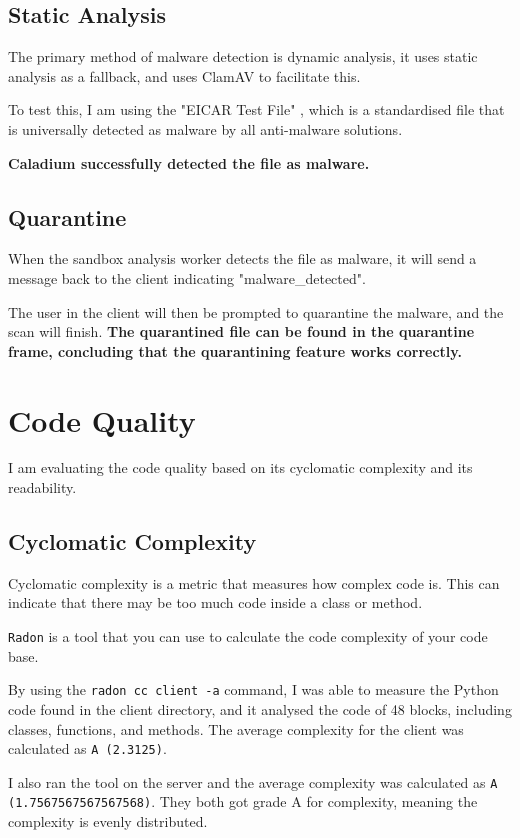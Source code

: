 \subsection{Static Analysis}
The primary method of malware detection is dynamic analysis,
it uses static analysis as a fallback,
and uses ClamAV to facilitate this.

To test this, I am using the "EICAR Test File" \cite{EICAR},
which is a standardised file that is universally
detected as malware by all anti-malware solutions.

\textbf{Caladium successfully detected the file as malware.}

\subsection{Quarantine}
When the sandbox analysis worker detects the file as malware,
it will send a message back to the client indicating "malware\_detected".

The user in the client will then be prompted to quarantine the malware,
and the scan will finish.
\textbf{The quarantined file can be found in the quarantine frame,
concluding that the quarantining feature works correctly.}

\section{Code Quality}
I am evaluating the code quality based on its
cyclomatic complexity and its readability.

\subsection{Cyclomatic Complexity}
Cyclomatic complexity is a metric that
measures how complex code is.
This can indicate that there may be too
much code inside a class or method.

\texttt{Radon} is a tool that you can use to
calculate the code complexity of your code base. \cite{radon}

By using the \texttt{radon cc client -a} command,
I was able to measure the Python code
found in the client directory,
and it analysed the code of 48 blocks,
including classes, functions, and methods.
The average complexity for the client
was calculated as \texttt{A (2.3125)}.

I also ran the tool on the server and the average complexity
was calculated as \texttt{A (1.7567567567567568)}.
They both got grade A for complexity,
meaning the complexity is evenly distributed.

